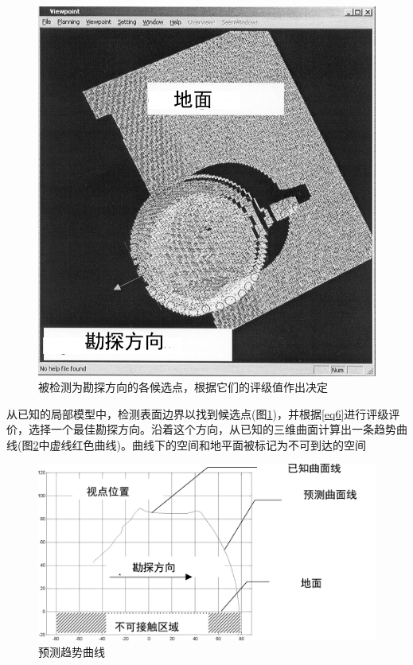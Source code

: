 \documentclass[AutoFakeBold,zihao=-4]{ctexart}
\begin{document}
	\begin{figure}[h]
		\centering
		\includegraphics[scale=0.4]{PIC8}
		\caption{被检测为勘探方向的各候选点，根据它们的评级值作出决定}
		\label{fig-Points}
	\end{figure}
	从已知的局部模型中，检测表面边界以找到候选点(图\ref{fig-Points})，并根据\eqref{eq6}进行评级评价，选择一个最佳勘探方向。沿着这个方向，从已知的三维曲面计算出一条趋势曲线(图\ref{fig-Predictive}中虚线红色曲线)。曲线下的空间和地平面被标记为不可到达的空间
	
	\begin{figure}[h]
		\centering
		\includegraphics[scale=0.15]{PIC9}
		\caption{预测趋势曲线}
		\label{fig-Predictive}
	\end{figure}
\end{document}
